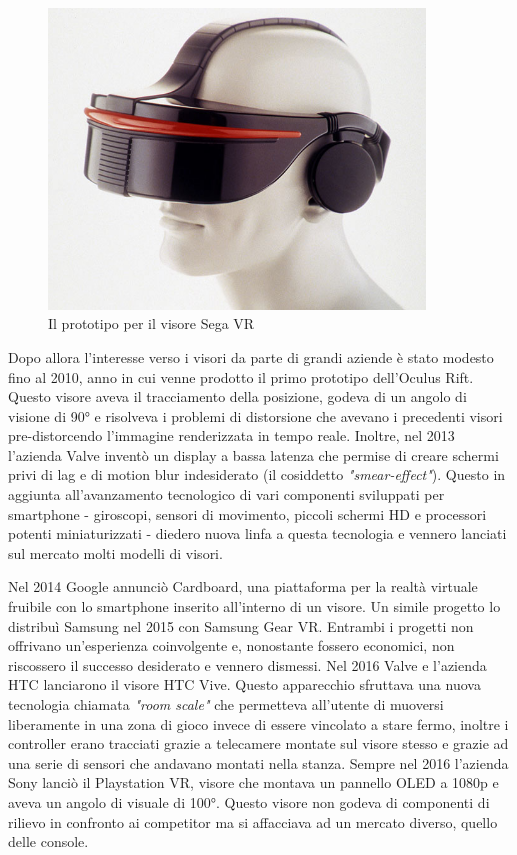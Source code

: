         \begin{figure}[!ht]
            \centering
            \includegraphics[width=10cm]{figure/SegaVR_0.jpg}
            \caption{Il prototipo per il visore Sega VR}
        \end{figure}

        Dopo allora l'interesse verso i visori da parte di grandi aziende è stato modesto fino al 2010, anno in cui venne prodotto il primo prototipo dell'Oculus Rift.
        Questo visore aveva il tracciamento della posizione, godeva di un angolo di visione di 90° e risolveva i problemi di distorsione che avevano i precedenti visori pre-distorcendo l'immagine renderizzata in tempo reale.
        Inoltre, nel 2013 l'azienda Valve inventò un display a bassa latenza che permise di creare schermi privi di lag e di motion blur indesiderato (il cosiddetto \textit{"smear-effect"}).
        Questo in aggiunta all'avanzamento tecnologico di vari componenti sviluppati per smartphone - giroscopi, sensori di movimento, piccoli schermi HD e processori potenti miniaturizzati - diedero nuova linfa a questa tecnologia e vennero lanciati sul mercato molti modelli di visori.

        
        Nel 2014 Google annunciò Cardboard, una piattaforma per la realtà virtuale fruibile con lo smartphone inserito all'interno di un visore.
        Un simile progetto lo distribuì Samsung nel 2015 con Samsung Gear VR.
        Entrambi i progetti non offrivano un'esperienza coinvolgente e, nonostante fossero economici, non riscossero il successo desiderato e vennero dismessi. 
        Nel 2016 Valve e l'azienda HTC lanciarono il visore HTC Vive.
        Questo apparecchio sfruttava una nuova tecnologia chiamata \textit{"room scale"} che permetteva all'utente di muoversi liberamente in una zona di gioco invece di essere vincolato a stare fermo, inoltre i controller erano tracciati grazie a telecamere montate sul visore stesso e grazie ad una serie di sensori che andavano montati nella stanza.
        Sempre nel 2016 l'azienda Sony lanciò il Playstation VR, visore che montava un pannello OLED a 1080p e aveva un angolo di visuale di 100°.
        Questo visore non godeva di componenti di rilievo in confronto ai competitor ma si affacciava ad un mercato diverso, quello delle console.

